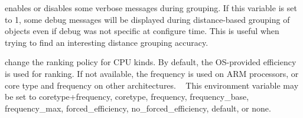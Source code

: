 \begin{DoxyDescription}
\item[H\+W\+L\+O\+C\+\_\+\+G\+R\+O\+U\+P\+I\+N\+G\+\_\+\+V\+E\+R\+B\+O\+SE=0 ]enables or disables some verbose messages during grouping. If this variable is set to 1, some debug messages will be displayed during distance-\/based grouping of objects even if debug was not specific at configure time. This is useful when trying to find an interesting distance grouping accuracy.


\item[H\+W\+L\+O\+C\+\_\+\+C\+P\+U\+K\+I\+N\+D\+S\+\_\+\+R\+A\+N\+K\+I\+NG=default ]change the ranking policy for C\+PU kinds. By default, the O\+S-\/provided efficiency is used for ranking. If not available, the frequency is used on A\+RM processors, or core type and frequency on other architectures. ~\newline
 This environment variable may be set to {\ttfamily coretype+frequency}, {\ttfamily coretype}, {\ttfamily frequency}, {\ttfamily frequency\+\_\+base}, {\ttfamily frequency\+\_\+max}, {\ttfamily forced\+\_\+efficiency}, {\ttfamily no\+\_\+forced\+\_\+efficiency}, {\ttfamily default}, or {\ttfamily none}. 



\end{DoxyDescription}
